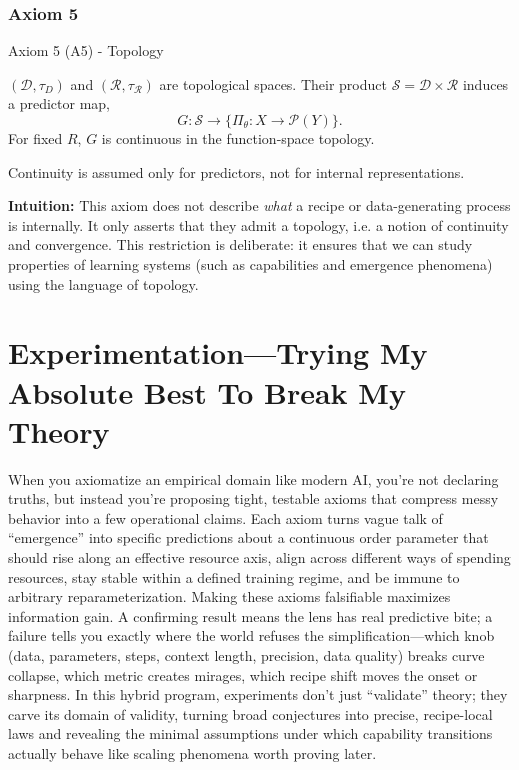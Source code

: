 \documentclass[12pt]{article}
\begin{document}
\subsubsection{Axiom 5}

\begin{statementbox}{Axiom 5 (A5) - Topology}

\((\mathcal D, \tau_D)\) and \((\mathcal R, \tau_\mathcal R)\) are topological spaces. Their product \(\mathcal S = \mathcal D \times \mathcal R \) induces a predictor map,
\[
G:\mathcal S \to \{\Pi_\theta : X\to \mathcal P (Y)\}.
\]
For fixed $R$, $G$ is continuous in the function-space topology. 

\end{statementbox}

Continuity is assumed only for predictors, not for internal representations.

\textbf{Intuition:} This axiom does not describe \textit{what} a recipe or data-generating process is internally. It only asserts that they admit a topology, i.e. a notion of continuity and convergence. This restriction is deliberate: it ensures that we can study properties of learning systems (such as capabilities and emergence phenomena) using the language of topology.

\section{Experimentation—Trying My Absolute Best To Break My Theory}

When you axiomatize an empirical domain like modern AI, you’re not declaring truths, but instead you’re proposing tight, testable axioms that compress messy behavior into a few operational claims. Each axiom turns vague talk of “emergence” into specific predictions about a continuous order parameter that should rise along an effective resource axis, align across different ways of spending resources, stay stable within a defined training regime, and be immune to arbitrary reparameterization. Making these axioms falsifiable maximizes information gain. A confirming result means the lens has real predictive bite; a failure tells you exactly where the world refuses the simplification—which knob (data, parameters, steps, context length, precision, data quality) breaks curve collapse, which metric creates mirages, which recipe shift moves the onset or sharpness. In this hybrid program, experiments don’t just “validate” theory; they carve its domain of validity, turning broad conjectures into precise, recipe-local laws and revealing the minimal assumptions under which capability transitions actually behave like scaling phenomena worth proving later.
\end{document}
